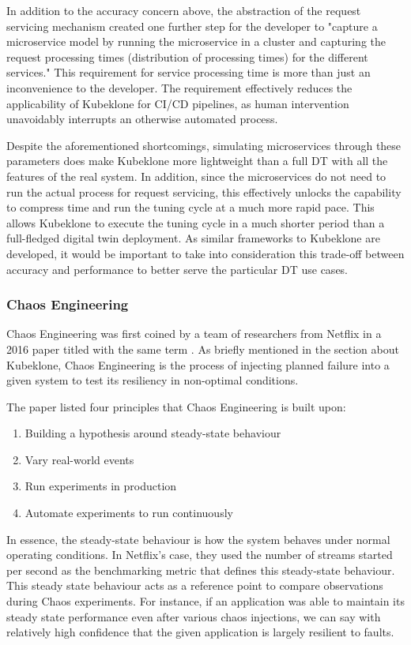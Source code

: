 In addition to the accuracy concern above, the abstraction of the request servicing mechanism created one further step for the developer to "capture a microservice model by running the microservice in a cluster and capturing the request processing times (distribution of processing times) for the different services." This requirement for service processing time is more than just an inconvenience to the developer. The requirement effectively reduces the applicability of Kubeklone for CI/CD pipelines, as human intervention unavoidably interrupts an otherwise automated process. 

Despite the aforementioned shortcomings, simulating microservices through these parameters does make Kubeklone more lightweight than a full DT with all the features of the real system. In addition, since the microservices do not need to run the actual process for request servicing, this effectively unlocks the capability to compress time and run the tuning cycle at a much more rapid pace. This allows Kubeklone to execute the tuning cycle in a much shorter period than a full-fledged digital twin deployment. As similar frameworks to Kubeklone are developed, it would be important to take into consideration this trade-off between accuracy and performance to better serve the particular DT use cases.

\subsubsection{Chaos Engineering}

Chaos Engineering was first coined by a team of researchers from Netflix in a 2016 paper titled with the same term \cite{basiri_chaos_2016}. As briefly mentioned in the section about Kubeklone, Chaos Engineering is the process of injecting planned failure into a given system to test its resiliency in non-optimal conditions.

The paper listed four principles that Chaos Engineering is built upon:

\begin{enumerate}
    \item Building a hypothesis around steady-state behaviour
    \item Vary real-world events
    \item Run experiments in production
    \item Automate experiments to run continuously
\end{enumerate}

In essence, the steady-state behaviour is how the system behaves under normal operating conditions. In Netflix's case, they used the number of streams started per second as the benchmarking metric that defines this steady-state behaviour. This steady state behaviour acts as a reference point to compare observations during Chaos experiments. For instance, if an application was able to maintain its steady state performance even after various chaos injections, we can say with relatively high confidence that the given application is largely resilient to faults.

